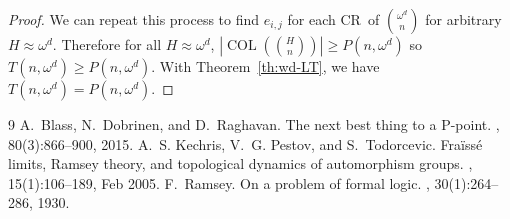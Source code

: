 \documentclass[10pt,a4paper]{article}
\newcommand{\om}{\omega}
\newcommand{\oequiv}{\approx}
\newcommand{\COL}{\operatorname{COL}}
\newcommand{\crulenospace}{CR}
\newcommand{\crule}{\crulenospace~}
\newcommand{\numpoints}{n}
\newcommand{\inumpoints}{i}
\newcommand{\idegr}{j}
\theoremstyle{plain}
\theoremstyle{definition}
\begin{document}
\begin{proof}
We can repeat this process to find $e_{\inumpoints,\idegr}$ for each \crule of $\binom{\om^d}{\numpoints}$ for arbitrary $H \oequiv \om^{d}$. Therefore for all 
$H \oequiv \omega^d$,
$\left|\COL\left(\binom{H}{\numpoints}\right)\right|\geq P(\numpoints,\om^d)$ so
$T(\numpoints,\om^d) \geq P\left(\numpoints, \om^d\right)$. With
Theorem~\ref{th:wd-LT}, we have
$T(\numpoints,\om^d) = P\left(\numpoints, \om^d\right)$.

\end{proof}

\begin{thebibliography}{9}
A.~Blass, N.~Dobrinen, and D.~Raghavan.
\newblock The next best thing to a {P}-point.
, 80(3):866–900, 2015.
A.~S. Kechris, V.~G. Pestov, and S.~Todorcevic.
\newblock Fra{\"i}ss{\'e} limits, {R}amsey theory, and topological dynamics of
  automorphism groups.
, 15(1):106--189, Feb
  2005.
F.~Ramsey.
\newblock On a problem of formal logic.
, 30(1):264--286, 1930.
\end{thebibliography}
\end{document}
